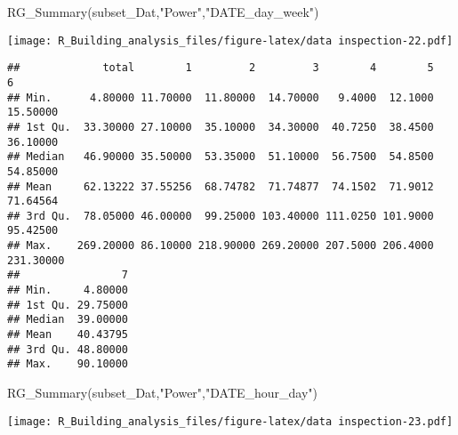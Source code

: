 \documentclass[
]{article}
\newenvironment{Shaded}{\begin{snugshade}}{\end{snugshade}}
\newcommand{\FunctionTok}[1]{\textcolor[rgb]{0.00,0.00,0.00}{#1}}
\newcommand{\NormalTok}[1]{#1}
\newcommand{\StringTok}[1]{\textcolor[rgb]{0.31,0.60,0.02}{#1}}
\begin{document}
\begin{Shaded}
\begin{Highlighting}[]
  \FunctionTok{RG\_Summary}\NormalTok{(subset\_Dat,}\StringTok{"Power"}\NormalTok{,}\StringTok{"DATE\_day\_week"}\NormalTok{)}
\end{Highlighting}
\end{Shaded}

\texttt{[image: R\_Building\_analysis\_files/figure-latex/data inspection-22.pdf]}

\begin{verbatim}
##             total        1         2         3        4        5         6
## Min.      4.80000 11.70000  11.80000  14.70000   9.4000  12.1000  15.50000
## 1st Qu.  33.30000 27.10000  35.10000  34.30000  40.7250  38.4500  36.10000
## Median   46.90000 35.50000  53.35000  51.10000  56.7500  54.8500  54.85000
## Mean     62.13222 37.55256  68.74782  71.74877  74.1502  71.9012  71.64564
## 3rd Qu.  78.05000 46.00000  99.25000 103.40000 111.0250 101.9000  95.42500
## Max.    269.20000 86.10000 218.90000 269.20000 207.5000 206.4000 231.30000
##                7
## Min.     4.80000
## 1st Qu. 29.75000
## Median  39.00000
## Mean    40.43795
## 3rd Qu. 48.80000
## Max.    90.10000
\end{verbatim}

\begin{Shaded}
\begin{Highlighting}[]
  \FunctionTok{RG\_Summary}\NormalTok{(subset\_Dat,}\StringTok{"Power"}\NormalTok{,}\StringTok{"DATE\_hour\_day"}\NormalTok{)}
\end{Highlighting}
\end{Shaded}

\texttt{[image: R\_Building\_analysis\_files/figure-latex/data inspection-23.pdf]}
\end{document}
